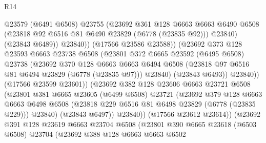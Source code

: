 \begin{lexlean}{R14}
\begin{coremodule}
{{{{{{{{{{{{{{{{{{{{{{{{{{{{{{{{{{{{{{{{{{{{{{{{{{{{{{{{{{{{{{{{{{{{{{{{{{{{{{{{{{                            @23579
                            (@6491 @6508)
                            @23755
                            (@23692
                              @361
                              @128
                              @6663
                              @6663
                              @6490
                              @6508
                              (@23818 @92 @6516 @81 @6490 @23829 (@6778 (@23835 @92)))
                              @23840)
                            (@23843 @6489))
                          @23840))
                      (@17566 @23586 @23588))
                    (@23692
                      @373
                      @128
                      @23593
                      @6663
                      @23738
                      @6508
                      (@23801
                        @372
                        @6665
                        @23592
                        (@6495 @6508)
                        @23738
                        (@23692
                          @370
                          @128
                          @6663
                          @6663
                          @6494
                          @6508
                          (@23818 @97 @6516 @81 @6494 @23829 (@6778 (@23835 @97)))
                          @23840)
                        (@23843 @6493))
                      @23840))
                  (@17566 @23599 @23601))
                (@23692
                  @382
                  @128
                  @23606
                  @6663
                  @23721
                  @6508
                  (@23801
                    @381
                    @6665
                    @23605
                    (@6499 @6508)
                    @23721
                    (@23692
                      @379
                      @128
                      @6663
                      @6663
                      @6498
                      @6508
                      (@23818 @229 @6516 @81 @6498 @23829 (@6778 (@23835 @229)))
                      @23840)
                    (@23843 @6497))
                  @23840))
              (@17566 @23612 @23614))
            (@23692
              @391
              @128
              @23619
              @6663
              @23704
              @6508
              (@23801
                @390
                @6665
                @23618
                (@6503 @6508)
                @23704
                (@23692
                  @388
                  @128
                  @6663
                  @6663
                  @6502
}}}}}}}}}}}}}}}}}}}}}}}}}}}}}}}}}}}}}}}}}}}}}}}}}}}}}}}}}}}}}}}}}}}}}}}}}}}}}}}}}}
\end{coremodule}
\end{lexlean}
